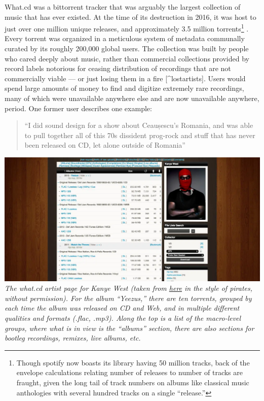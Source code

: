 \documentclass[10pt]{tufte-book}
\begin{document}
What.cd was a bittorrent tracker that was arguably the largest
collection of music that has ever existed. At the time of its
destruction in 2016, it was host to just over one million unique
releases, and approximately 3.5 million torrents\footnote{Though spotify
  now boasts its library having 50 million tracks, back of the envelope
  calculations relating number of releases to number of tracks are
  fraught, given the long tail of track numbers on albums like classical
  music anthologies with several hundred tracks on a single ``release.''}
\citep{dunhamWhatCDLegacy2018} . Every torrent was organized in a
meticulous system of metadata communally curated by its roughly 200,000
global users. The collection was built by people who cared deeply about
music, rather than commercial collections provided by record labels
notorious for ceasing distribution of recordings that are not
commercially viable --- or just losing them in a fire \citep{rosenDayMusicBurned2019} {[}\^{}lostartists{]}. Users would spend
large amounts of money to find and digitize extremely rare recordings,
many of which were unavailable anywhere else and are now unavailable
anywhere, period. One former user describes one example:

\begin{quote}
``I did sound design for a show about Ceaușescu's Romania, and was able
to pull together all of this 70s dissident prog-rock and stuff that has
never been released on CD, let alone outside of Romania'' \citep{sonnadEulogyWhatCd2016} 
\end{quote}

\includegraphics[width=\linewidth]{../assets/images/kanye-what.png} \emph{The
what.cd artist page for Kanye West (taken from
\href{https://qz.com/840661/what-cd-is-gone-a-eulogy-for-the-greatest-music-collection-in-the-world/}{here}
in the style of pirates, without permission). For the album ``Yeezus,''
there are ten torrents, grouped by each time the album was released on
CD and Web, and in multiple different qualities and formats (.flac,
.mp3). Along the top is a list of the macro-level groups, where what is
in view is the ``albums'' section, there are also sections for bootleg
recordings, remixes, live albums, etc.}
\end{document}

